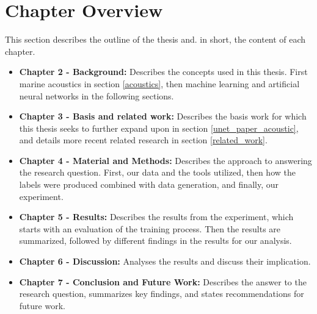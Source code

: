 \section{Chapter Overview}
    This section describes the outline of the thesis and. in short, the content of each chapter.
    \begin{itemize}
        \item \textbf{Chapter 2 - Background: } Describes the concepts used in this thesis. First marine acoustics in section \ref{acoustics}, then machine learning and artificial neural networks in the following sections.
        \item \textbf{Chapter 3 - Basis and related work:} Describes the basis work for which this thesis seeks to further expand upon in section \ref{unet_paper_acoustic}, and details more recent related research in section \ref{related_work}.
        \item \textbf{Chapter 4 - Material and Methods:} Describes the approach to answering the research question. First, our data and the tools utilized, then how the labels were produced combined with data generation, and finally, our experiment.
        \item \textbf{Chapter 5 - Results:} Describes the results from the experiment, which starts with an evaluation of the training process. Then the results are summarized, followed by different findings in the results for our analysis. 
        \item \textbf{Chapter 6 - Discussion:}  Analyses the results and discuss their implication. 
        \item \textbf{Chapter 7 - Conclusion and Future Work:}  Describes the answer to the research question, summarizes key findings, and states recommendations for future work.
    \end{itemize}




